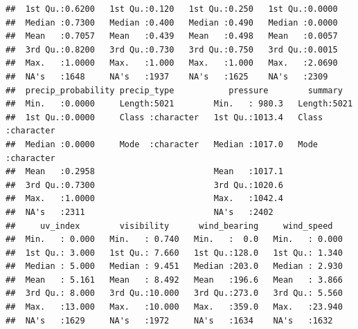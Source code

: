 \documentclass[
]{article}
\begin{document}
\begin{verbatim}
##  1st Qu.:0.6200   1st Qu.:0.120   1st Qu.:0.250   1st Qu.:0.0000  
##  Median :0.7300   Median :0.400   Median :0.490   Median :0.0000  
##  Mean   :0.7057   Mean   :0.439   Mean   :0.498   Mean   :0.0057  
##  3rd Qu.:0.8200   3rd Qu.:0.730   3rd Qu.:0.750   3rd Qu.:0.0015  
##  Max.   :1.0000   Max.   :1.000   Max.   :1.000   Max.   :2.0690  
##  NA's   :1648     NA's   :1937    NA's   :1625    NA's   :2309    
##  precip_probability precip_type           pressure        summary         
##  Min.   :0.0000     Length:5021        Min.   : 980.3   Length:5021       
##  1st Qu.:0.0000     Class :character   1st Qu.:1013.4   Class :character  
##  Median :0.0000     Mode  :character   Median :1017.0   Mode  :character  
##  Mean   :0.2958                        Mean   :1017.1                     
##  3rd Qu.:0.7300                        3rd Qu.:1020.6                     
##  Max.   :1.0000                        Max.   :1042.4                     
##  NA's   :2311                          NA's   :2402                       
##     uv_index        visibility      wind_bearing     wind_speed    
##  Min.   : 0.000   Min.   : 0.740   Min.   :  0.0   Min.   : 0.000  
##  1st Qu.: 3.000   1st Qu.: 7.660   1st Qu.:128.0   1st Qu.: 1.340  
##  Median : 5.000   Median : 9.451   Median :203.0   Median : 2.930  
##  Mean   : 5.161   Mean   : 8.492   Mean   :196.6   Mean   : 3.866  
##  3rd Qu.: 8.000   3rd Qu.:10.000   3rd Qu.:273.0   3rd Qu.: 5.560  
##  Max.   :13.000   Max.   :10.000   Max.   :359.0   Max.   :23.940  
##  NA's   :1629     NA's   :1972     NA's   :1634    NA's   :1632
\end{verbatim}
\end{document}
